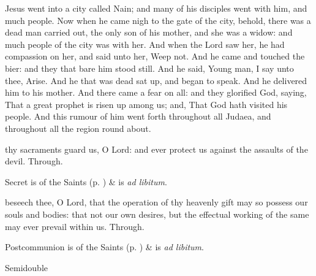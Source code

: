  Jesus went into a city called Nain; and many of his disciples went with him, and much people. Now when he came nigh to the gate of the city, behold, there was a dead man carried out, the only son of his mother, and she was a widow: and much people of the city was with her. And when the Lord saw her, he had compassion on her, and said unto her, Weep not. And he came and touched the bier: and they that bare him stood still. And he said, Young man, I say unto thee, Arise. And he that was dead sat up, and began to speak. And he delivered him to his mother. And there came a fear on all: and they glorified God, saying, That a great prophet is risen up among us; and, That God hath visited his people. And this rumour of him went forth throughout all Judaea, and throughout all the region round about.


\secret
{} thy sacraments guard us, O Lord: and ever protect us against the assaults of the devil. Through.
\begin{rubric}
     Secret is of the Saints (p. \pageref{SPSaints}) \&  is \emph{ad libitum}.
\end{rubric}


\postcommunion
{} beseech thee, O Lord, that the operation of thy heavenly gift may so possess our souls and bodies: that not our own desires, but the effectual working of the same may ever prevail within us. Through.
\begin{rubric}
     Postcommunion is of the Saints (p. \pageref{SPSaints}) \&  is \emph{ad libitum}.
\end{rubric}

\vspace{-1ex}

\begin{inhead}
{Semidouble}
\end{inhead}
\par\noindent
{}

